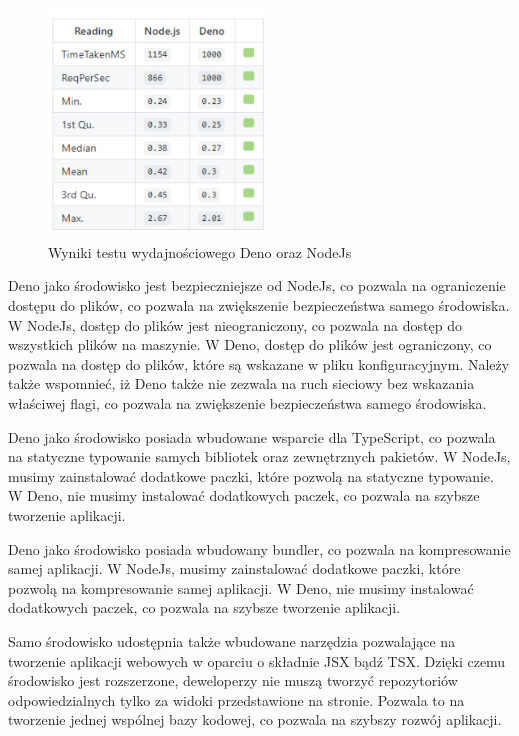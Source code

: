 \begin{figure}[H]
  \centering
  \includegraphics[width=0.52\textwidth]{Figures/deno_performance.png}
  \caption{Wyniki testu wydajnościowego Deno oraz NodeJs \cite{deno_performance}}
  \label{fig:deno_vs_node}
\end{figure}

Deno jako środowisko jest bezpieczniejsze od NodeJs, co pozwala na ograniczenie dostępu do plików, co pozwala na zwiększenie bezpieczeństwa samego środowiska. W NodeJs, dostęp do plików jest nieograniczony, co pozwala na dostęp do wszystkich plików na maszynie. W Deno, dostęp do plików jest ograniczony, co pozwala na dostęp do plików, które są wskazane w pliku konfiguracyjnym. Należy także wspomnieć, iż Deno także nie zezwala na ruch sieciowy bez wskazania właściwej flagi, co pozwala na zwiększenie bezpieczeństwa samego środowiska.

Deno jako środowisko posiada wbudowane wsparcie dla TypeScript, co pozwala na statyczne typowanie samych bibliotek oraz zewnętrznych pakietów. W NodeJs, musimy zainstalować dodatkowe paczki, które pozwolą na statyczne typowanie. W Deno, nie musimy instalować dodatkowych paczek, co pozwala na szybsze tworzenie aplikacji.

Deno jako środowisko posiada wbudowany bundler, co pozwala na kompresowanie samej aplikacji. W NodeJs, musimy zainstalować dodatkowe paczki, które pozwolą na kompresowanie samej aplikacji. W Deno, nie musimy instalować dodatkowych paczek, co pozwala na szybsze tworzenie aplikacji.

Samo środowisko udostępnia także wbudowane narzędzia pozwalające na tworzenie aplikacji webowych w oparciu o składnie JSX bądź TSX. Dzięki czemu środowisko jest rozszerzone, deweloperzy nie muszą tworzyć repozytoriów odpowiedzialnych tylko za widoki przedstawione na stronie. Pozwala to na tworzenie jednej wspólnej bazy kodowej, co pozwala na szybszy rozwój aplikacji.

